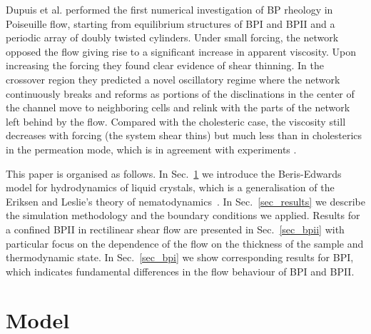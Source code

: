 \documentclass[12pt,twoside]{iopart}
\begin{document}
Dupuis et al. \cite{Dupuis:2005} performed the first numerical investigation of BP rheology in Poiseuille flow, starting from equilibrium structures of BPI and BPII and a periodic array of doubly twisted cylinders.
Under small forcing, the network opposed the flow giving rise to a significant increase in apparent viscosity.
Upon increasing the forcing they found clear evidence of shear thinning.
In the crossover region they predicted a novel oscillatory regime where the network continuously breaks and reforms as portions of the disclinations in the center of the channel move to neighboring cells and relink with the parts of the network left behind by the flow. Compared with the cholesteric case, the viscosity still decreases with forcing (the system shear thins) but much less than in cholesterics in the permeation mode, which is in agreement with experiments
\cite{Zapotocky:1999, Ramos:2002}.

This paper is organised as follows.
In Sec.~\ref{sec_model} we introduce the Beris-Edwards model for hydrodynamics of liquid crystals, which is a generalisation of the Eriksen and Leslie's theory of nematodynamics~\cite{deGennes}.
In Sec.~\ref{sec_results} we describe the simulation methodology and the
boundary conditions we applied.
Results for a confined BPII in rectilinear shear flow are presented in
Sec.~\ref{sec_bpii} with particular focus on the dependence of the flow
on the thickness of the sample and thermodynamic state.
In Sec.~\ref{sec_bpi} we show corresponding results for BPI, which indicates fundamental differences in the flow behaviour of BPI and BPII. 

\section{Model}\label{sec_model}
\end{document}
